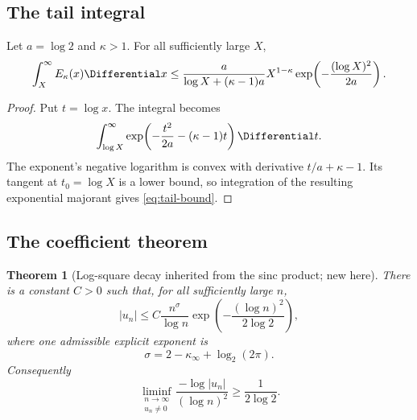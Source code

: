 \documentclass[11pt,oneside]{article}
\numberwithin{equation}{section}
\newtheorem{theorem}{Theorem}[section]
\theoremstyle{definition}
\theoremstyle{remark}
\begin{document}
\subsection{The tail integral}

\begin{lemma}
\label{lem:tail-bound}
Let $a=\log2$ and $\kappa>1$.  For all sufficiently large $X$,
\begin{equation}
 \int_X^\infty E_\kappa(x)\Differential x
 \le
 \frac{a}{\log X+(\kappa-1)a}
 X^{1-\kappa}
 \exp\!\left(-\frac{(\log X)^2}{2a}\right).
 \label{eq:tail-bound}
\end{equation}
\end{lemma}

\begin{proof}
Put $t=\log x$.  The integral becomes
\[
 \int_{\log X}^{\infty}
 \exp\!\left(-\frac{t^2}{2a}-(\kappa-1)t\right)\Differential t.
\]
The exponent's negative logarithm is convex with derivative
$t/a+\kappa-1$.  Its tangent at $t_0=\log X$ is a lower bound, so integration
of the resulting exponential majorant gives \eqref{eq:tail-bound}.
\end{proof}

\subsection{The coefficient theorem}

\begin{theorem}[Log-square decay inherited from the sinc product; new here]
\label{thm:un-log-square}
There is a constant $C>0$ such that, for all sufficiently large $n$,
\begin{equation}
 \boxed{
 |u_n|\le
 C\frac{n^\sigma}{\log n}
 \exp\!\left(-\frac{(\log n)^2}{2\log2}\right),}
 \label{eq:un-log-square}
\end{equation}
where one admissible explicit exponent is
\begin{equation}
 \sigma=2-\kappa_\infty+\log_2(2\pi).
 \label{eq:sigma}
\end{equation}
Consequently
\begin{equation}
 \liminf_{\substack{n\to\infty\\u_n\ne0}}
 \frac{-\log|u_n|}{(\log n)^2}
 \ge\frac1{2\log2}.
 \label{eq:un-liminf}
\end{equation}
\end{theorem}
\end{document}
